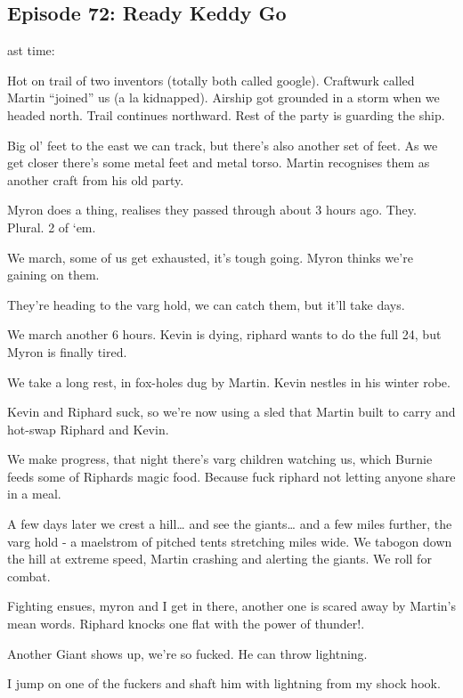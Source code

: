 \subsection{Episode 72: Ready Keddy Go}

ast time:\medskip

Hot on trail of two inventors (totally both called google). Craftwurk called Martin “joined” us (a la kidnapped). Airship got grounded in a storm when we headed north. Trail continues northward. Rest of the party is guarding the ship.\medskip

Big ol’ feet to the east we can track, but there’s also another set of feet. As we get closer there’s some metal feet and metal torso. Martin recognises them as another craft from his old party.\medskip

Myron does a thing, realises they passed through about 3 hours ago. They. Plural. 2 of ‘em.\medskip

We march, some of us get exhausted, it’s tough going. Myron thinks we’re gaining on them.\medskip

They’re heading to the varg hold, we can catch them, but it’ll take days.\medskip

We march another 6 hours. Kevin is dying, riphard wants to do the full 24, but Myron is finally tired.\medskip

We take a long rest, in fox-holes dug by Martin. Kevin nestles in his winter robe.\medskip

Kevin and Riphard suck, so we’re now using a sled that Martin built to carry and hot-swap Riphard and Kevin.\medskip

We make progress, that night there’s varg children watching us, which Burnie feeds some of Riphards magic food. Because fuck riphard not letting anyone share in a meal.\medskip

A few days later we crest a hill… and see the giants… and a few miles further, the varg hold - a maelstrom of pitched tents stretching miles wide. We tabogon down the hill at extreme speed, Martin crashing and alerting the giants. We roll for combat.\medskip

Fighting ensues, myron and I get in there, another one is scared away by Martin’s mean words. Riphard knocks one flat with the power of thunder!.\medskip

Another Giant shows up, we’re so fucked. He can throw lightning.\medskip

I jump on one of the fuckers and shaft him with lightning from my shock hook.\medskip

